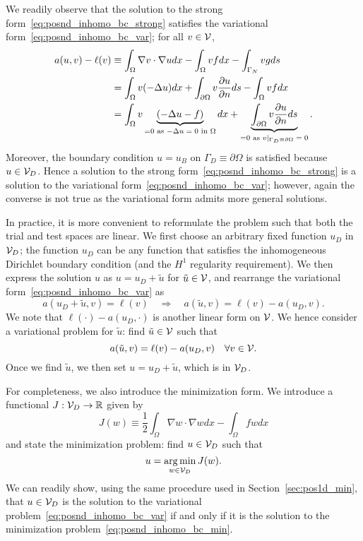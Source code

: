 We readily observe that the solution to the strong form~\eqref{eq:posnd_inhomo_bc_strong} satisfies the variational form~\eqref{eq:posnd_inhomo_bc_var};  for all $v \in \mathcal{V}$,
\begin{align*}
  a(u,v) - \ell(v)
  &\equiv \int_\Omega \nabla v \cdot \nabla u dx - \int_\Omega vf dx - \int_{\Gamma_N} vg ds
  \\
  &= \int_\Omega v (-\Delta u) dx + \int_{\partial \Omega} v \frac{\partial u}{\partial n} ds  - \int_\Omega vf dx 
  \\
  &= \int_\Omega v \underbrace{ (-\Delta u - f) }_{= 0 \text{ as $-\Delta u=  0$ in $\Omega$}} dx
  + \underbrace{ \int_{\partial \Omega} v \frac{\partial u}{\partial n} ds }_{= 0 \text{ as $v|_{\Gamma_D \equiv \partial \Omega} = 0$}}.
\end{align*}
Moreover, the boundary condition $u = u_B$ on $\Gamma_D \equiv \partial \Omega$ is satisfied because $u \in \mathcal{V}_D$. 
Hence a solution to the strong form~\eqref{eq:posnd_inhomo_bc_strong} is a solution to the variational form~\eqref{eq:posnd_inhomo_bc_var}; however, again the converse is not true as the variational form admits more general solutions.

In practice, it is more convenient to reformulate the problem such that both the trial and test spaces are linear.  We first choose an arbitrary fixed function $u_D$ in $\mathcal{V}_D$; the function $u_D$ can be any function that satisfies the inhomogeneous Dirichlet boundary condition (and the $H^1$ regularity requirement). We then express the solution $u$ as $u = u_D + \tilde u$ for $\tilde u \in \mathcal{V}$, and rearrange the variational form~\eqref{eq:posnd_inhomo_bc_var} as
\begin{equation*}
  a(u_D + \tilde u,v) = \ell(v) \quad \Rightarrow \quad
  a(\tilde u,v) = \ell(v) - a(u_D,v).
\end{equation*}
We note that $\ell(\cdot) - a(u_D,\cdot)$ is another linear form on $\mathcal{V}$. We hence consider a variational problem for $\tilde u$: find $\tilde u \in \mathcal{V}$ such that
\begin{equation*}
  a(\tilde u,v) = \ell(v) - a(u_D,v) \quad \forall v \in \mathcal{V}.
\end{equation*}
Once we find $\tilde u$, we then set $u = u_D + \tilde u$, which is in $\mathcal{V}_D$.

For completeness, we also introduce the minimization form.  We introduce a functional $J: \mathcal{V}_D \to \mathbb{R}$ given by
\begin{equation}
  J(w) \equiv \frac{1}{2} \int_{\Omega} \nabla w \cdot \nabla w dx - \int_\Omega f w dx
  \label{eq:posnd_inhomo_bc_min_func}
\end{equation}
and state the minimization problem: find $u \in \mathcal{V}_D$ such that
\begin{equation}
  u = \operatorname*{arg\,min}_{w \in \mathcal{V}_D} J(w).
  \label{eq:posnd_inhomo_bc_min}
\end{equation}
We can readily show, using the same procedure used in Section~\ref{sec:pos1d_min}, that $u \in \mathcal{V}_D$ is the solution to the variational problem~\eqref{eq:posnd_inhomo_bc_var} if and only if it is the solution to the minimization problem~\eqref{eq:posnd_inhomo_bc_min}.

